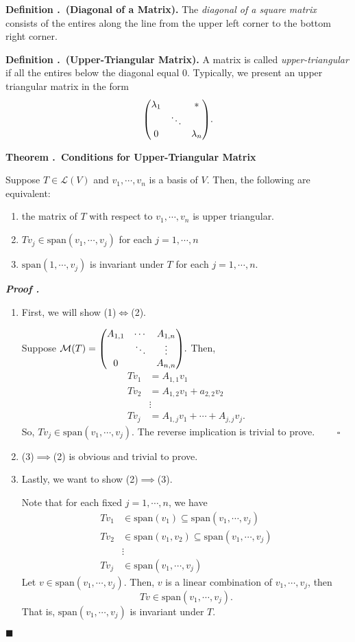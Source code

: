 \documentclass[11pt, letterpaper]{article}
\newcounter{index}[subsection]
\newenvironment*{df}[1]{\par\noindent\textbf{Definition \thesubsection.\stepcounter{index}\theindex\ (#1).}}{\par}
\newenvironment*{thm}[1]{\begin{tcolorbox}\par\noindent\textbf{Theorem \thesubsection.\stepcounter{index}\theindex\ #1} \par}{\par\end{tcolorbox}}
\newcounter{nprf}[subsection]
\newenvironment*{prf}{\par\indent\textbf{\textit{Proof \stepcounter{nprf}\thenprf.}}}{\hfill$\blacksquare$\par}
\def\L{\mathcal{L}}
\def\M{\mathcal{M}}
\def\span{\mathrm{span}}
\def\pqde{\qquad\square}
\begin{document}
\begin{df}{Diagonal of a Matrix}
	The \textit{diagonal of a square matrix} consists of the entires along the line from the upper left corner to the bottom right corner. 	
\end{df}
\begin{df}{Upper-Triangular Matrix}
	A matrix is called \textit{upper-triangular} if all the entires below the diagonal equal $0$. Typically, we present an upper triangular matrix in the form \[\mqty(\lambda_1&&*\\&\ddots&\\0&&\lambda_n).\]
\end{df}
\begin{thm}{Conditions for Upper-Triangular Matrix}
	Suppose $T\in\L(V)$ and $v_1,\cdots,v_n$ is a basis of $V$. Then, the following are equivalent: 
	\begin{enumerate}
		\item the matrix of $T$ with respect to $v_1,\cdots,v_n$ is upper triangular.
		\item $Tv_j\in\span(v_1,\cdots,v_j)$ for each $j=1,\cdots,n$
		\item $\span(1,\cdots,v_j)$ is invariant under $T$ for each $j=1,\cdots,n$.
	\end{enumerate}
\end{thm}
\begin{prf}
	\begin{enumerate}
		\item First, we will show (1)$\iff$(2).\par Suppose $\M(T)=\mqty(A_{1,1}&\cdots&A_{1,n}\\&\ddots&\vdots\\0&&A_{n,n}).$ Then, \[\begin{aligned}Tv_1&=A_{1,1}v_1\\Tv_2&=A_{1,2}v_1+a_{2,2}v_2\\&\vdots\\Tv_j&=A_{1,j}v_1+\cdots+A_{j,j}v_j.\end{aligned}\] So, $Tv_j\in\span(v_1,\cdots,v_j)$. The reverse implication is trivial to prove. $\pqde$
		\item (3)$\implies$(2) is obvious and trivial to prove.
		\item Lastly, we want to show (2)$\implies$(3).\par Note that for each fixed $j=1,\cdots,n$, we have \[\begin{aligned}Tv_1&\in\span(v_1)\subseteq\span(v_1,\cdots,v_j)\\Tv_2&\in\span(v_1,v_2)\subseteq\span(v_1,\cdots,v_j)\\&\vdots\\Tv_j&\in\span(v_1,\cdots,v_j)\end{aligned}\] Let $v\in\span(v_1,\cdots,v_j)$. Then, $v$ is a linear combination of $v_1,\cdots,v_j$, then \[Tv\in\span(v_1,\cdots,v_j).\] That is, $\span(v_1,\cdots,v_j)$ is invariant under $T$.
	\end{enumerate}	
\end{prf}
\end{document}
